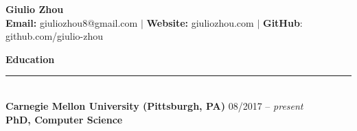 \documentclass{article}
\begin{document}
\newcommand{\HRule}{\rule{\linewidth}{0.2mm}}


\begin{center}
\textbf{{\LARGE Giulio Zhou}} \\ 
\textbf{\fontsize{11}{13.2} Email:} giuliozhou8@gmail.com  $|$ \textbf{Website:} giuliozhou.com $|$ \textbf{GitHub}: github.com/giulio-zhou\\[2mm]
\end{center}


\normalsize
\noindent
\textbf{{\Large Education}}\\[-2mm]
\HRule\\
\textbf{Carnegie Mellon University (Pittsburgh, PA)}
\hfill 08/2017 -- \textit{present} \\
\indent
\textbf{PhD, Computer Science} \\
\vspace{-4mm}
\end{document}
